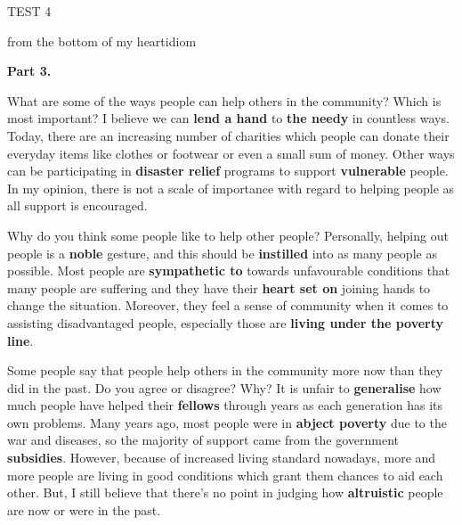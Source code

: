 \begin{glossarymc}[Cambridge 9]
\begin{test}{TEST 4}
\begin{VocabExplain}[Part 2]
            \begin{ExplainCard}{from the bottom of my heart}{idiom}
            \end{ExplainCard}
        \end{VocabExplain}

    \noindent
    \textbf{Part 3.}
    \begin{qa}{What are some of the ways people can help others in the community? Which is most important?}
    I believe we can \textbf{lend a hand} to \textbf{the needy} in countless ways. Today, there are an increasing number of charities which people can donate their everyday items like clothes or footwear or even a small sum of money. Other ways can be participating in \textbf{disaster relief} programs to support \textbf{vulnerable} people. In my opinion, there is not a scale of importance with regard to helping people as all support is encouraged.
    \end{qa}

    \begin{qa}{Why do you think some people like to help other people?}
    Personally, helping out people is a \textbf{noble} gesture, and this should be \textbf{instilled} into as many people as possible. Most people are \textbf{sympathetic to} towards unfavourable conditions that many people are suffering and they have their \textbf{heart set on} joining hands to change the situation. Moreover, they feel a sense of community when it comes to assisting disadvantaged people, especially those are \textbf{living under the poverty line}.
    \end{qa}

    \begin{qa}{Some people say that people help others in the community more now than they did in the past. Do you agree or disagree? Why?}
    It is unfair to \textbf{generalise} how much people have helped their \textbf{fellows} through years as each generation has its own problems. Many years ago, most people were in \textbf{abject poverty} due to the war and diseases, so the majority of support came from the government \textbf{subsidies}. However, because of increased living standard nowadays, more and more people are living in good conditions which grant them chances to aid each other. But, I still believe that there's no point in judging how \textbf{altruistic} people are now or were in the past.
    \end{qa}


\end{test}
\end{glossarymc}
